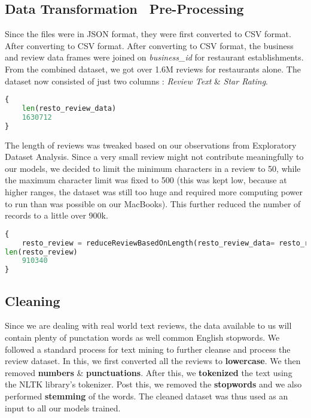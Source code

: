 \documentclass[paper=a4, fontsize=11pt]{scrartcl} %
\numberwithin{equation}{section} %
\numberwithin{figure}{section} %
\numberwithin{table}{section} %
\begin{document}
\subsection{Data Transformation \ Pre-Processing}
Since the files were in JSON format, they were first converted to CSV format. After converting to CSV format. After converting to CSV format, the business and review data frames were joined on \textit{business\_id} for restaurant establishments. From the combined dataset, we got over 1.6M reviews for restaurants alone. The dataset now consisted of just two columns : \textit{Review Text} \& \textit{Star Rating}. \\
\begin{lstlisting}[language=python]
{
  	len(resto_review_data)
  	1630712
}
\end{lstlisting}
The length of reviews was tweaked based on our observations from Exploratory Dataset Analysis. Since a very small review might not contribute meaningfully to our models, we decided to limit the minimum characters in a review to 50, while the maximum character limit was fixed to 500 (this was kept low, because at higher ranges, the dataset was still too huge and required more computing power to run than was possible on our MacBooks).
This further reduced the number of records to a little over 900k. \\
\begin{lstlisting}[language=python]
{
  	resto_review = reduceReviewBasedOnLength(resto_review_data= resto_review_data, minReviewLen=50, maxReviewLen=500)
len(resto_review)
  	910340
}
\end{lstlisting}
\subsection{Cleaning}
Since we are dealing with real world text reviews, the data available to us will contain plenty of punctation words as well common English stopwords. We followed a standard process for text mining to further cleanse and process the review dataset. In this, we first converted all the reviews to \textbf{lowercase}. We then removed \textbf{numbers} \& \textbf{punctuations}. After this, we \textbf{tokenized} the text using the NLTK library's tokenizer. Post this, we removed the \textbf{stopwords} and we also performed \textbf{stemming} of the words. The cleaned dataset was thus used as an input to all our models trained.
\end{document}
